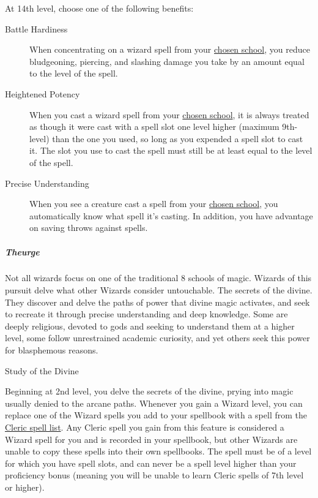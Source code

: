 At 14th level, choose one of the following benefits:

\begin{description}
\item[Battle Hardiness]
When concentrating on a wizard spell from your
\hyperref[wizard-subclass-arcanist-scholarly-speciality]{chosen school},
you reduce bludgeoning, piercing, and slashing damage you take by an
amount equal to the level of the spell.
\end{description}

\begin{description}
\item[Heightened Potency]
When you cast a wizard spell from your
\hyperref[wizard-subclass-arcanist-scholarly-speciality]{chosen school},
it is always treated as though it were cast with a spell slot one level
higher (maximum 9th-level) than the one you used, so long as you
expended a spell slot to cast it. The slot you use to cast the spell
must still be at least equal to the level of the spell.
\end{description}

\begin{description}
\item[Precise Understanding]
When you see a creature cast a spell from your
\hyperref[wizard-subclass-arcanist-scholarly-speciality]{chosen school},
you automatically know what spell it's casting. In addition, you have
advantage on saving throws against spells.
\end{description}

\subparagraph{Theurge}\label{wizard-subclass-theurge}

Not all wizards focus on one of the traditional 8 schools of magic.
Wizards of this pursuit delve what other Wizards consider untouchable.
The secrets of the divine. They discover and delve the paths of power
that divine magic activates, and seek to recreate it through precise
understanding and deep knowledge. Some are deeply religious, devoted to
gods and seeking to understand them at a higher level, some follow
unrestrained academic curiosity, and yet others seek this power for
blasphemous reasons.

Study of the Divine

Beginning at 2nd level, you delve the secrets of the divine, prying into
magic usually denied to the arcane paths. Whenever you gain a Wizard
level, you can replace one of the Wizard spells you add to your
spellbook with a spell from the \hyperref[spell-list-cleric]{Cleric
spell list}. Any Cleric spell you gain from this feature is considered a
Wizard spell for you and is recorded in your spellbook, but other
Wizards are unable to copy these spells into their own spellbooks. The
spell must be of a level for which you have spell slots, and can never
be a spell level higher than your proficiency bonus (meaning you will be
unable to learn Cleric spells of 7th level or higher).

